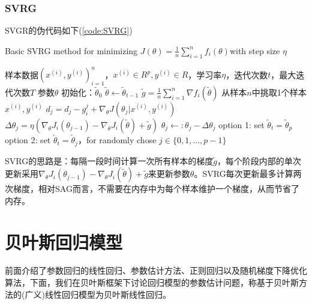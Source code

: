         \subsubsection{SVRG}
            \par
            SVGR的伪代码如下(\ref{code:SVRG})
            \begin{algorithm}[h]
                \caption{Basic SVRG method for minimizing $J(\theta) = \frac 1n \sum_{i = 1}^nf_i(\theta)$with step size $\eta$}\label{code:SVRG}
                \begin{algorithmic}[h]
                    \Require 样本数据$(x^{(i)},y^{(i)})_{i=1}^n$，$x^{(i)}\in R^p,y^{(i)}\in R$，学习率$\eta$，迭代次数$t$，最大迭代次数$T$
                    \Ensure 参数$\theta$
                    \State 初始化：$\tilde{\theta}_0 $
                      \State $\tilde{\theta} \leftarrow \tilde{\theta}_{t-1}$
                      \State $\tilde{g} = \frac{1}{n} \sum\limits_{i =1}^n \nabla f_i(\tilde{\theta})$
                      \State 从样本$n$中挑取1个样本$x^{(i)},y^{(i)}$
                        \State $d_j = d_j - g_i^j + \nabla _\theta J(\theta_j|x^{(i)},y^{(i)})$
                        \State $\Delta \theta_j = \eta \left( \nabla_\theta J_i(\theta_{j-1})  - \nabla_\theta J_i(\tilde{\theta}) + \tilde{g}\right) $
                        \State $\theta_j \leftarrow:\theta_j - \Delta \theta_j$
                      \EndFor
                      \State option 1: set $\tilde{\theta}_t = \tilde{\theta}_p$
                      \State option 2: set $\tilde{\theta}_t = \tilde{\theta}_j$，for randomly chose $j\in \{0,1,\dots,p-1\}$
                    \EndFor
                \end{algorithmic}
            \end{algorithm}
            \par
            SVRG的思路是：每隔一段时间计算一次所有样本的梯度$\tilde{g}$，每个阶段内部的单次更新采用$\nabla_\theta J_i(\theta_{j-1})  - \nabla_\theta J_i(\tilde{\theta}) + \tilde{g}$来更新参数$\theta$。SVRG每次更新最多计算两次梯度，相对SAG而言，不需要在内存中为每个样本维护一个梯度，从而节省了内存。

\section{贝叶斯回归模型}
    \par
    前面介绍了参数回归的线性回归、参数估计方法、正则回归以及随机梯度下降优化算法，下面，我们在贝叶斯框架下讨论回归模型的参数估计问题，称基于贝叶斯方法的(广义)线性回归模型为贝叶斯线性回归。
